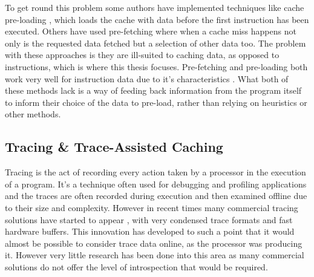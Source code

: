 To get round this problem some authors have implemented techniques like cache pre-loading \cite{ozawaCacheMissHeuristics1995}, which loads the cache with data before the first instruction has been executed. Others have used pre-fetching \cite{garsideRealtimePrefetchingSharedmemory2015} where when a cache miss happens not only is the requested data fetched but a selection of other data too. The problem with these approaches is they are ill-suited to caching data, as opposed to instructions, which is where this thesis focuses. Pre-fetching and pre-loading both work very well for instruction data due to it's characteristics \cite{leeWhenPrefetchingWorks2012, smithCacheMemories1982}. What both of these methods lack is a way of feeding back information from the program itself to inform their choice of the data to pre-load, rather than relying on heuristics or other methods.


\subsection{Tracing \& Trace-Assisted Caching}

Tracing is the act of recording every action taken by a processor in the execution of a program. It's a technique often used for debugging and profiling applications and the traces are often recorded during execution and then examined offline due to their size and complexity. However in recent times many commercial tracing solutions have started to appear \cite{CoreSightBaseSystem18, NiosIIProcessor2019}, with very condensed trace formats and fast hardware buffers. This innovation has developed to such a point that it would almost be possible to consider trace data online, as the processor was producing it. However very little research has been done into this area \cite{ponugotiEnablingOntheFlyHardware2019} as many commercial solutions do not offer the level of introspection that would be required.

